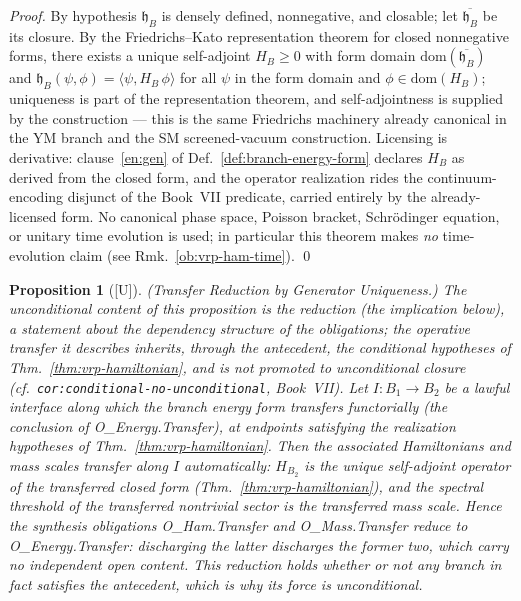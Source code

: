 \documentclass[12pt,oneside]{amsbook}
\theoremstyle{plain}
\newtheorem{proposition}[theorem]{Proposition}
\theoremstyle{definition}
\theoremstyle{remark}
\newcommand{\status}[1]{\textup{[#1]}}
\begin{document}
\begin{proof}
By hypothesis $\mathfrak{h}_B$ is densely defined, nonnegative,
and closable; let $\overline{\mathfrak{h}_B}$ be its closure.  By
the Friedrichs--Kato representation theorem for closed nonnegative
forms, there exists a unique self-adjoint $H_B \ge 0$ with form
domain $\mathrm{dom}(\overline{\mathfrak{h}_B})$ and
$\mathfrak{h}_B(\psi,\phi) = \langle \psi, H_B\,\phi\rangle$ for
all $\psi$ in the form domain and $\phi \in \mathrm{dom}(H_B)$;
uniqueness is part of the representation theorem, and
self-adjointness is supplied by the construction --- this is the
same Friedrichs machinery already canonical in the YM branch and
the SM screened-vacuum construction.  Licensing is derivative:
clause~\ref{en:gen} of Def.~\ref{def:branch-energy-form} declares
$H_B$ as derived from the closed form, and the operator
realization rides the continuum-encoding disjunct of the Book~VII
predicate, carried entirely by the already-licensed form.  No
canonical phase space, Poisson bracket, Schr\"odinger equation, or
unitary time evolution is used; in particular this theorem makes
\emph{no} time-evolution claim (see Rmk.~\ref{ob:vrp-ham-time}).
\qed
\end{proof}

\begin{proposition}[\status{U}]\label{prop:vrp-transfer-reduction}
\textup{(Transfer Reduction by Generator Uniqueness.)}
\emph{The unconditional content of this proposition is the
reduction (the implication below), a statement about the
dependency structure of the obligations; the operative transfer
it describes inherits, through the antecedent, the conditional
hypotheses of Thm.~\ref{thm:vrp-hamiltonian}, and is not promoted
to unconditional closure (cf.~\texttt{cor:conditional-no-unconditional},
Book~VII).}
Let $I : B_1 \to B_2$ be a lawful interface along which the branch
energy form transfers functorially (the conclusion of
O\_Energy.Transfer), at endpoints satisfying the realization
hypotheses of Thm.~\ref{thm:vrp-hamiltonian}.  Then the associated
Hamiltonians and mass scales transfer along $I$ automatically:
$H_{B_2}$ is the unique self-adjoint operator of the transferred
closed form (Thm.~\ref{thm:vrp-hamiltonian}), and the spectral
threshold of the transferred nontrivial sector is the transferred
mass scale.  Hence the synthesis obligations O\_Ham.Transfer and
O\_Mass.Transfer \emph{reduce} to O\_Energy.Transfer: discharging
the latter discharges the former two, which carry no independent
open content.  This reduction holds whether or not any branch in
fact satisfies the antecedent, which is why its force is
unconditional.
\end{proposition}
\end{document}
